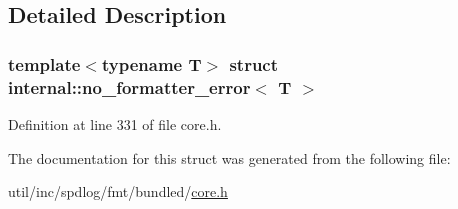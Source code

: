 \subsection{Detailed Description}
\subsubsection*{template$<$typename T$>$\newline
struct internal\+::no\+\_\+formatter\+\_\+error$<$ T $>$}



Definition at line 331 of file core.\+h.



The documentation for this struct was generated from the following file\+:\begin{DoxyCompactItemize}
\item 
util/inc/spdlog/fmt/bundled/\hyperlink{core_8h}{core.\+h}\end{DoxyCompactItemize}
